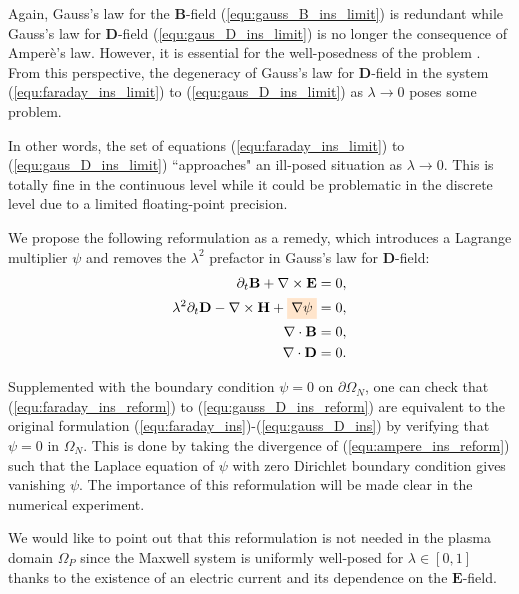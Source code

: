 \documentclass{article}
\begin{document}
Again, Gauss's law for the $\mathbf{B}$-field (\ref{equ:gauss_B_ins_limit}) is redundant while Gauss's law for $\mathbf{D}$-field (\ref{equ:gaus_D_ins_limit}) is no longer the consequence of Amper\`{e}'s law. However, it is essential for the well-posedness of the problem \citep{ana_2010}. From this perspective, the degeneracy of Gauss's law for $\mathbf{D}$-field in the system (\ref{equ:faraday_ins_limit}) to (\ref{equ:gaus_D_ins_limit}) as $\lambda \rightarrow 0$ poses some problem.

In other words, the set of equations (\ref{equ:faraday_ins_limit}) to (\ref{equ:gaus_D_ins_limit}) ``approaches" an ill-posed situation as $\lambda \rightarrow 0$. This is totally fine in the continuous level while it could be problematic in the discrete level due to a limited floating-point precision. 

We propose the following reformulation as a remedy, which introduces a Lagrange multiplier $\psi$ and removes the $\lambda^2$ prefactor in Gauss's law for $\mathbf{D}$-field:
\begin{subequations}
\begin{align}
    \partial_t \mathbf{B} + \nabla \times \mathbf{E} &= 0, \label{equ:faraday_ins_reform}\\ 
    \lambda^2 \partial_t \mathbf{D} - \nabla \times \mathbf{H} + \colorbox{orange!20}{$\nabla \psi$} &= 0,  \label{equ:ampere_ins_reform}\\
    \nabla \cdot \mathbf{B} &= 0, \label{equ:gauss_B_ins_reform}\\
    \nabla \cdot \mathbf{D} &= 0 \label{equ:gauss_D_ins_reform}.
\end{align}
\end{subequations}

Supplemented with the boundary condition $\psi = 0$ on $\partial\Omega_N$, one can check that (\ref{equ:faraday_ins_reform}) to (\ref{equ:gauss_D_ins_reform}) are equivalent to the original formulation (\ref{equ:faraday_ins})-(\ref{equ:gauss_D_ins}) by verifying that $\psi = 0$ in $\Omega_N$. This is done by taking the divergence of (\ref{equ:ampere_ins_reform}) such that the Laplace equation of $\psi$ with zero Dirichlet boundary condition gives vanishing $\psi$. The importance of this reformulation will be made clear in the numerical experiment. 

We would like to point out that this reformulation is not needed in the plasma domain $\Omega_P$ since the Maxwell system is uniformly well-posed for $\lambda \in [0,1]$ thanks to the existence of an electric current and its dependence on the $\mathbf{E}$-field. 
\end{document}
